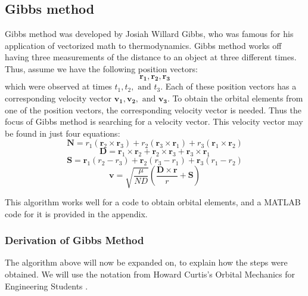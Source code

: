 \documentclass[12pt]{article}
\begin{document}
	\subsection{Gibbs method}
	Gibbs method was developed by Josiah Willard Gibbs\cite{gibbsBio}, who was famous for his application of vectorized math to thermodynamics. Gibbs method works off having three measurements of the distance to an object at three different times. Thus, assume we have the following position vectors:
	\begin{equation}
	\boldsymbol{r_1}, 	\boldsymbol{r_2},	\boldsymbol{r_3}
	\end{equation}
	which were observed at times $t_1, t_2, \text{ and  } t_3$. Each of these position vectors has a corresponding velocity vector $\boldsymbol{v_1}, 	\boldsymbol{v_2},	\text{ and  } \boldsymbol{v_3}$. To obtain the orbital elements from one of the position vectors, the corresponding velocity vector is needed. Thus the focus of Gibbs method is searching for a velocity vector. This velocity vector may be found in just four equations:
	\begin{equation}
	\mathbf { N } = r _ { 1 } \left( \mathbf { r } _ { 2 } \times \mathbf { r } _ { 3 } \right) + r _ { 2 } \left( \mathbf { r } _ { 3 } \times \mathbf { r } _ { 1 } \right) + r _ { 3 } \left( \mathbf { r } _ { 1 } \times \mathbf { r } _ { 2 } \right)
	\end{equation}
	\begin{equation}
	\mathbf { D } = \mathbf { r } _ { 1 } \times \mathbf { r } _ { 2 } + \mathbf { r } _ { 2 } \times \mathbf { r } _ { 3 } + \mathbf { r } _ { 3 } \times \mathbf { r } _ { 1 }
	\end{equation}
	\begin{equation}
	\mathbf { S } = \mathbf { r } _ { 1 } \left( r _ { 2 } - r _ { 3 } \right) + \mathbf { r } _ { 2 } \left( r _ { 3 } - r _ { 1 } \right) + \mathbf { r } _ { 3 } \left( r _ { 1 } - r _ { 2 } \right)
	\end{equation}
	\begin{equation}
	\mathbf { v } = \sqrt { \frac { \mu } { N D } } \left( \frac { \mathbf { D } \times \mathbf { r } } { r } + \mathbf { S } \right)
	\end{equation}
	
	This algorithm works well for a code to obtain orbital elements, and a MATLAB code for it is provided in the appendix.
		
	\subsubsection{Derivation of Gibbs Method}
	The algorithm above will now be expanded on, to explain how the steps were obtained. We will use the notation from Howard Curtis's Orbital Mechanics for Engineering Students \cite{curtis2013_gibbs}. 
	
\end{document}
